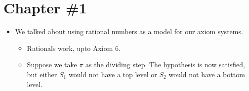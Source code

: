 


\section*{Chapter \#1}

\begin{itemize}
    \item We talked about using rational numbers as a model for our axiom systems.
    \begin{itemize}
        \item Rationals work, upto Axiom 6.
        \item Suppose we take $\pi$ as the dividing step. The hypothesis is now satisfied, but either $S_1$ would not have a top level or $S_2$ would not have a bottom level.
    \end{itemize}
\end{itemize}


